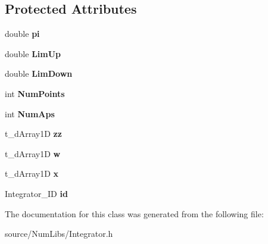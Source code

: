 \subsection*{Protected Attributes}
\begin{DoxyCompactItemize}
\item 
\hypertarget{class_c___integrator_a10fd437e91139e648c26f22c27acc68a}{double {\bfseries pi}}\label{class_c___integrator_a10fd437e91139e648c26f22c27acc68a}

\item 
\hypertarget{class_c___integrator_afe6f53fe7f18c781efa40c81ff113d8c}{double {\bfseries Lim\-Up}}\label{class_c___integrator_afe6f53fe7f18c781efa40c81ff113d8c}

\item 
\hypertarget{class_c___integrator_a6bc5931c732701ea5b5508872aa0ea31}{double {\bfseries Lim\-Down}}\label{class_c___integrator_a6bc5931c732701ea5b5508872aa0ea31}

\item 
\hypertarget{class_c___integrator_ae7f8dca17a5d827daa043dc07dd6db6d}{int {\bfseries Num\-Points}}\label{class_c___integrator_ae7f8dca17a5d827daa043dc07dd6db6d}

\item 
\hypertarget{class_c___integrator_a52b2288212669ae13046fab0b36c1187}{int {\bfseries Num\-Aps}}\label{class_c___integrator_a52b2288212669ae13046fab0b36c1187}

\item 
\hypertarget{class_c___integrator_ac9f9888fdaac04322b0c74be60cb7570}{t\-\_\-d\-Array1\-D {\bfseries zz}}\label{class_c___integrator_ac9f9888fdaac04322b0c74be60cb7570}

\item 
\hypertarget{class_c___integrator_a20071d107c241a83bbd095e3e7a0a395}{t\-\_\-d\-Array1\-D {\bfseries w}}\label{class_c___integrator_a20071d107c241a83bbd095e3e7a0a395}

\item 
\hypertarget{class_c___integrator_a9d1f44d22fc4677341cd52232a02d3df}{t\-\_\-d\-Array1\-D {\bfseries x}}\label{class_c___integrator_a9d1f44d22fc4677341cd52232a02d3df}

\item 
\hypertarget{class_c___integrator_a514bec9424e799d9c4078c148c114f3b}{Integrator\-\_\-\-I\-D {\bfseries id}}\label{class_c___integrator_a514bec9424e799d9c4078c148c114f3b}

\end{DoxyCompactItemize}


The documentation for this class was generated from the following file\-:\begin{DoxyCompactItemize}
\item 
source/\-Num\-Libs/Integrator.\-h\end{DoxyCompactItemize}
